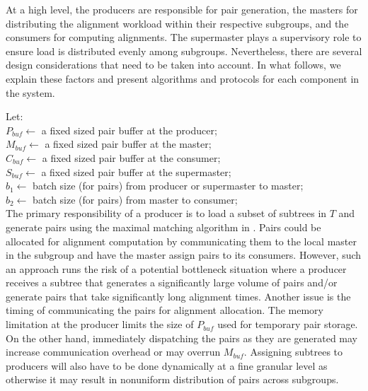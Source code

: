 \documentclass[10pt,journal,letterpaper,compsoc]{IEEEtran}
\begin{document}
At a high level, the producers are responsible for pair generation, the masters for distributing the alignment workload within their respective subgroups, and the consumers for computing alignments. The supermaster plays a supervisory role to ensure load is distributed evenly among subgroups. Nevertheless, there are several design considerations that need to be taken into account. In what follows, we explain these factors and present algorithms and protocols for each component in the system. 

 Let:\\
$P_{buf}\leftarrow$ a fixed sized pair buffer at the producer;\\
$M_{buf}\leftarrow$ a fixed sized pair buffer at the master;\\
$C_{buf}\leftarrow$ a fixed sized pair buffer at the consumer;\\
$S_{buf}\leftarrow$ a fixed sized pair buffer at the supermaster;\\
$b_1\leftarrow$ batch size (for pairs) from producer or supermaster to master;\\
$b_2\leftarrow$ batch size (for pairs) from master to consumer;\\


The primary responsibility of a producer is to load a subset of subtrees in $T$ and generate pairs using the maximal matching algorithm in \cite{Kalyanaraman07}. Pairs could be allocated for alignment computation by communicating them to the local master in the subgroup and have the master assign pairs to its consumers. However, such an approach runs the risk of a potential bottleneck situation where a producer receives a subtree that generates a significantly large volume of pairs and/or generate pairs that take significantly long alignment times. Another issue is the timing of communicating the pairs for alignment allocation. The memory limitation at the producer limits the size of $P_{buf}$ used for temporary pair storage. On the other hand, immediately dispatching the pairs as they are generated may increase communication overhead or may overrun $M_{buf}$. Assigning subtrees to producers will also have to be done dynamically at a fine granular level as otherwise it may result in nonuniform distribution of pairs across subgroups. 
\end{document}

